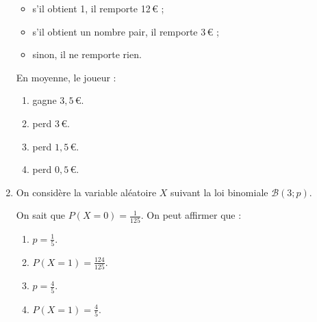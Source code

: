 \begin{enumerate}
	\begin{itemize}
		\item s'il obtient 1, il remporte 12\,€ ;
		\item s'il obtient un nombre pair, il remporte 3\,€ ;
		\item sinon, il ne remporte rien.
	\end{itemize}
	
	En moyenne, le joueur :
	\begin{enumerate}
		\item gagne $3,5$\,€.
		\item perd 3\,€.
		\item perd $1,5$\,€.
		\item perd $0,5$\,€.
	\end{enumerate}
	\item On considère la variable aléatoire $X$ suivant la loi binomiale $\mathcal{B}(3;p)$.
	
	On sait que $P(X = 0) = \frac{1}{125}$. On peut affirmer que :
	\begin{enumerate}
		\item $p=\frac15$.
		\item $P(X=1)=\frac{124}{125}$.
		\item $p=\frac45$.
		\item $P(X=1)=\frac45$.
	\end{enumerate}
\end{enumerate}